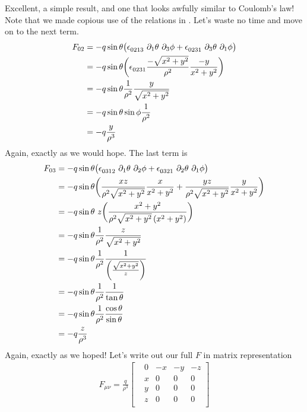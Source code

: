 %
Excellent, a simple result, and one that looks awfully similar to Coulomb's law! Note that we made copious use of the relations in \cite{Wiki:1}. Let's waste no time and move on to the next term.
%
\begin{align}
	F_{0 2} &= - q \sin{\theta} \big( \epsilon\indices{_{0213}} \ \partial_{1} \theta \ \partial_{3} \phi +  \epsilon\indices{_{0231}} \ \partial_{3} \theta \ \partial_{1} \phi \big) \\
	&= - q \sin{\theta} \bigg( \epsilon\indices{_{0231}} \frac{-\sqrt{x^2 + y^2}}{\rho^2} \frac{-y}{x^2 + y^2} \bigg) \\
	&= - q \sin{\theta} \frac{1}{\rho^2} \frac{y}{\sqrt{x^2 + y^2}} \\
	&= - q \sin{\theta} \sin{\phi} \frac{1}{\rho^2} \\
	&= - q \frac{y}{\rho^3}
\end{align} 
% 
Again, exactly as we would hope. The last term is 
%
\begin{align}
	F_{0 3} &= - q \sin{\theta} \big( \epsilon\indices{_{0312}} \ \partial_{1} \theta \ \partial_{2} \phi +  \epsilon\indices{_{0321}} \ \partial_{2} \theta \ \partial_{1} \phi \big) \\
	&= - q \sin{\theta} \bigg(\frac{xz}{\rho^2 \sqrt{x^2 + y^2}} \frac{x}{x^2 + y^2} + \frac{yz}{\rho^2 \sqrt{x^2 + y^2}} \frac{y}{x^2 + y^2}\bigg) \\
	&= - q \sin{\theta} \ z \bigg(\frac{x^2 + y^2}{\rho^2 \sqrt{x^2 + y^2} \left(x^2 + y^2\right)} \bigg) \\
	&= - q \sin{\theta} \frac{1}{\rho^2} \frac{z}{\sqrt{x^2 + y^2}} \\
	&= - q \sin{\theta} \frac{1}{\rho^2} \frac{1}{\left(\frac{\sqrt{x^2 + y^2}}{z}\right)} \\
	&= - q \sin{\theta} \frac{1}{\rho^2} \frac{1}{\tan{\theta}} \\
	&= - q \sin{\theta} \frac{1}{\rho^2} \frac{\cos{\theta}}{\sin{\theta}} \\
	&= - q \frac{z}{\rho^3}
\end{align} 
% 
Again, exactly as we hoped! Let's write out our full $F$ in matrix representation
%
\begin{align}
	F_{\mu\nu} = \frac{q}{\rho^3} \begin{bmatrix}
		& 0 & -x  &-y & -z\\ 
		& x & 0 &0 &0 \\
		& y & 0 &0 &0 \\
		& z & 0 &0 &0 \\
	\end{bmatrix} 
\end{align}	

